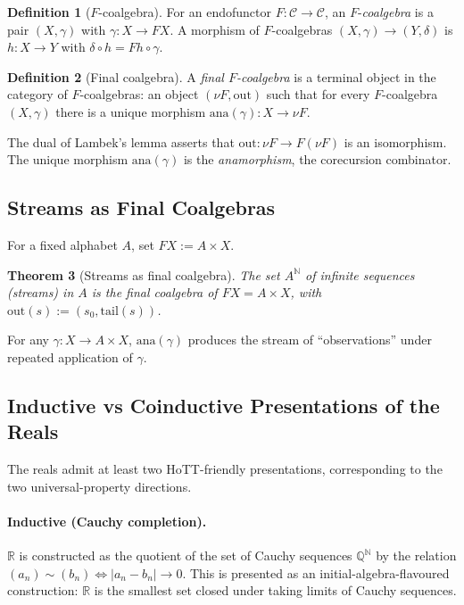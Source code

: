 \documentclass[12pt]{article}
\newtheorem{theorem}{Theorem}[section]
\theoremstyle{definition}
\newtheorem{definition}[theorem]{Definition}
\theoremstyle{remark}
\newcommand{\N}{\mathbb{N}}
\newcommand{\Q}{\mathbb{Q}}
\newcommand{\R}{\mathbb{R}}
\begin{document}
\begin{definition}[$F$-coalgebra]
For an endofunctor $F \colon \mathcal{C} \to \mathcal{C}$, an $F$-\emph{coalgebra} is a pair $(X, \gamma)$ with $\gamma \colon X \to F X$. A morphism of $F$-coalgebras $(X, \gamma) \to (Y, \delta)$ is $h \colon X \to Y$ with $\delta \circ h = F h \circ \gamma$.
\end{definition}

\begin{definition}[Final coalgebra]
A \emph{final $F$-coalgebra} is a terminal object in the category of $F$-coalgebras: an object $(\nu F, \mathrm{out})$ such that for every $F$-coalgebra $(X, \gamma)$ there is a unique morphism $\mathrm{ana}(\gamma) \colon X \to \nu F$.
\end{definition}

The dual of Lambek's lemma asserts that $\mathrm{out} \colon \nu F \to F(\nu F)$ is an isomorphism. The unique morphism $\mathrm{ana}(\gamma)$ is the \emph{anamorphism}, the corecursion combinator.

\subsection{Streams as Final Coalgebras}

For a fixed alphabet $A$, set $F X := A \times X$.

\begin{theorem}[Streams as final coalgebra]
\label{thm:streams}
The set $A^{\N}$ of infinite sequences (streams) in $A$ is the final coalgebra of $F X = A \times X$, with $\mathrm{out}(s) := (s_0, \mathrm{tail}(s))$.
\end{theorem}

For any $\gamma \colon X \to A \times X$, $\mathrm{ana}(\gamma)$ produces the stream of ``observations'' under repeated application of $\gamma$.

\subsection{Inductive vs Coinductive Presentations of the Reals}

The reals admit at least two HoTT-friendly presentations, corresponding to the two universal-property directions.

\paragraph{Inductive (Cauchy completion).}
$\R$ is constructed as the quotient of the set of Cauchy sequences $\Q^{\N}$ by the relation $(a_n) \sim (b_n) \iff |a_n - b_n| \to 0$. This is presented as an initial-algebra-flavoured construction: $\R$ is the smallest set closed under taking limits of Cauchy sequences.
\end{document}
